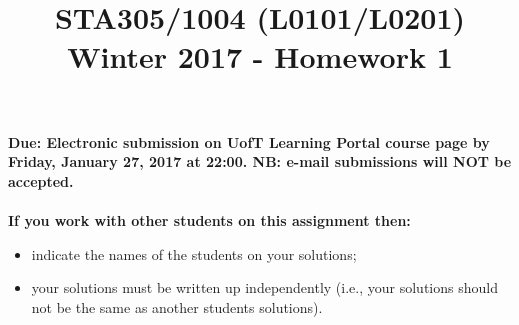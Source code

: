 \documentclass[11pt, oneside]{article}   	%
\title{STA305/1004 (L0101/L0201) Winter 2017 -  Homework 1}
\author{}
\date{}							%
\begin{document}
\maketitle


{\noindent \bf Due: Electronic submission on UofT Learning Portal course page by Friday, January 27, 2017 at 22:00. NB: e-mail submissions will NOT be accepted.} \\ \\


{\noindent \bf If you work with other students on this assignment then:}  
\begin{itemize}
\item indicate the names of the students on your solutions;  
\item your solutions must be written up independently (i.e., your solutions should not be the same as another students solutions).
\end{itemize}


\newpage
\end{document}

